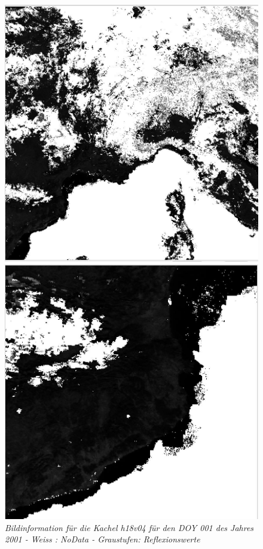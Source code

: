 \documentclass[11pt]{report}
\begin{document}
\begin{figure}[H]
   \begin{minipage}[b]{.4\linewidth} %
      \includegraphics[scale=0.28]{./Grafiken/Fitting/Fitting_durchführung/Fitting_Vergleich_Rohdaten_Qualität_full_2.JPG}
	\caption{\textit{Bildinformation für die Kachel h18v04 für den DOY 001 des Jahres 2001 - Weiss : NoData - Graustufen: Reflexionswerte}}
   \end{minipage}
   \hspace{.1\linewidth}%
   \begin{minipage}[b]{.4\linewidth} %
      \includegraphics[scale=0.28]{./Grafiken/Fitting/Fitting_durchführung/Fitting_Vergleich_Rohdaten_Qualität_2.JPG}

\end{minipage}
\end{figure}
\end{document}
